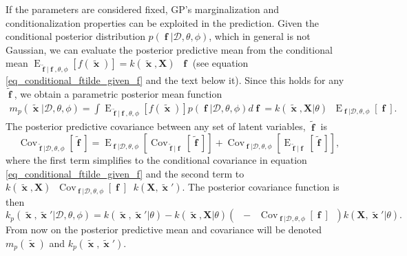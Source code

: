 \documentclass[twoside,11pt]{article}
\DeclareMathOperator{\iKff}{\mathbf{K}_{f,f}^{-1}}
\DeclareMathOperator{\Kfa}{\mathbf{K}_{f,\tilde{f}}}
\DeclareMathOperator{\Kaf}{\mathbf{K}_{\tilde{f},f}}
\DeclareMathOperator{\Kaa}{\mathbf{K}_{\tilde{f},\tilde{f}}}
\DeclareMathOperator{\x}{\mathbf{x}}
\DeclareMathOperator{\f}{\mathbf{f}}
\newcommand{\mb}{\mathbf}
\DeclareMathOperator{\E}{E}
\DeclareMathOperator{\COV}{Cov}
\begin{document}
If the parameters are considered fixed, GP's marginalization and
conditionalization properties can be exploited in the prediction.
Given the conditional posterior distribution $p(\f|\mathcal{D},\theta,
\phi)$, which in general is not Gaussian, we can evaluate the
posterior predictive mean from the conditional mean
$\E_{\tilde{\f}|\f,\theta,\phi}[f(\tilde{\x})] =
k(\tilde{\x},\mb{X})\iKff\f$ (see equation
\eqref{eq_conditional_ftilde_given_f} and the text below it). Since
this holds for any $\tilde{\f}$, we obtain a parametric posterior mean
function
%
\begin{eqnarray}\label{eq_posterior_predictive_mean}
m_p(\tilde{\x}|\mathcal{D},\theta,\phi) =
\int \E_{\tilde{\f}|\f,\theta,\phi}[f(\tilde{\x})]
p(\f|\mathcal{D},\theta,\phi) d\f = k(\tilde{\x},\mb{X}|\theta)\iKff
\E_{\f|\mathcal{D},\theta,\phi}[\f]. 
\end{eqnarray}
%
The posterior predictive covariance between any set of latent
variables, $\tilde{\f}$ is 
%
\begin{equation}
\COV_{\tilde{\f}|\mathcal{D},\theta,\phi}[\tilde{\f}] = \E_{\f|\mathcal{D},\theta,\phi}
\left[\COV_{\tilde{\f}|\f}[\tilde{\f}] \right] +
\COV_{\f|\mathcal{D},\theta,\phi}\left[\E_{\tilde{\f}|\f}[\tilde{\f} ]\right],
\end{equation}
%
where the first term simplifies to the conditional covariance in
equation \eqref{eq_conditional_ftilde_given_f} and the second term to
$k(\tilde{\x},\mb{X}) \iKff \COV_{\f|\mathcal{D},\theta,\phi}[\f]\iKff
k(\mb{X},\tilde{\x}')$. The posterior covariance function is then
%
\begin{equation}\label{eq_posterior_predictive_covariance}
k_p(\tilde{\x},\tilde{\x}'|\mathcal{D},\theta,\phi) = k(\tilde{\x},\tilde{\x}'|\theta) - k(\tilde{\x},\mb{X}|\theta) \left(\iKff -
\iKff \COV_{\f|\mathcal{D},\theta,\phi}[\f]\iKff\right)k(\mb{X},\tilde{\x}'|\theta). 
\end{equation}
%
From now on the posterior predictive mean and covariance will be
denoted $m_p(\tilde{\x})$ and $k_p(\tilde{\x},\tilde{\x}')$.
\end{document}
